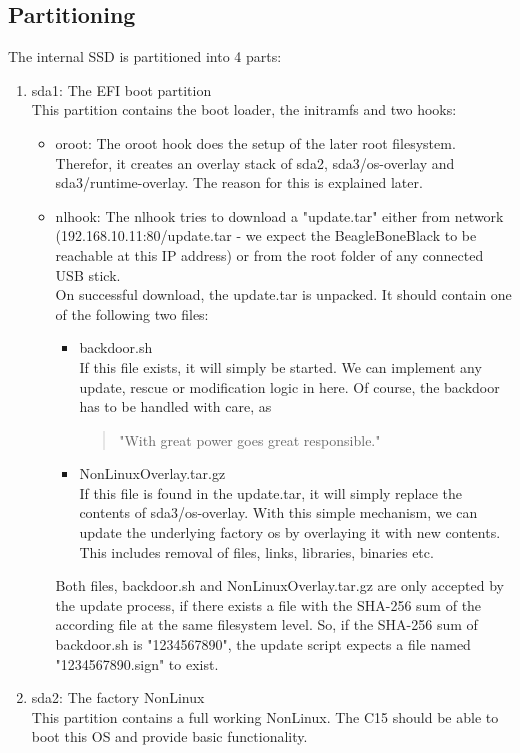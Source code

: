 \documentclass[10pt,a4paper]{article}
\begin{document}
\subsection{Partitioning}
The internal SSD is partitioned into 4 parts:
\begin{enumerate}
\item sda1: The EFI boot partition\\
This partition contains the boot loader, the initramfs and two hooks:
\begin{itemize}
\item oroot:
The oroot hook does the setup of the later root filesystem. Therefor, it creates an overlay stack of sda2, sda3/os-overlay and sda3/runtime-overlay. The reason for this is explained later.
\item nlhook:
The nlhook tries to download a "update.tar" either from network (192.168.10.11:80/update.tar - we expect the BeagleBoneBlack to be reachable at this IP address) or from the root folder of any connected USB stick.\\
On successful download, the update.tar is unpacked. It should contain one of the following two files:
\begin{itemize}
\item backdoor.sh\\
If this file exists, it will simply be started. We can implement any update, rescue or modification logic in here. Of course, the backdoor has to be handled with care, as \begin{quote}"With great power goes great responsible."\end{quote}
\item NonLinuxOverlay.tar.gz\\
If this file is found in the update.tar, it will simply replace the contents of sda3/os-overlay. With this simple mechanism, we can update the underlying factory os by overlaying it with new contents. This includes removal of files, links, libraries, binaries etc.
\end{itemize}
Both files, backdoor.sh and NonLinuxOverlay.tar.gz are only accepted by the update process, if there exists a file with the SHA-256 sum of the according file at the same filesystem level. So, if the SHA-256 sum of backdoor.sh is "1234567890", the update script expects a file named "1234567890.sign" to exist.
\end{itemize}
\item sda2: The factory NonLinux\\
This partition contains a full working NonLinux. The C15 should be able to boot this OS and provide basic functionality.

\end{enumerate}
\end{document}
